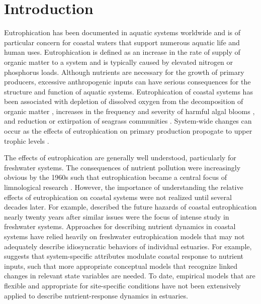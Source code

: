 \documentclass[letterpaper,12pt,oneside]{article}\usepackage{graphicx, color}
\begin{document}
\section{Introduction} \label{intro}

Eutrophication has been documented in aquatic systems worldwide and is of particular concern for coastal waters that support numerous aquatic life and human uses.  Eutrophication is defined as an increase in the rate of supply of organic matter to a system \citep{Nixon95} and is typically caused by elevated nitrogen or phosphorus loads.  Although nutrients are necessary for the growth of primary producers, excessive anthropogenic inputs can have serious consequences for the structure and function of aquatic systems.  Eutrophication of coastal systems has been associated with depletion of dissolved oxygen from the decomposition of organic matter \citep{Diaz08}, increases in the frequency and severity of harmful algal blooms \citep{Glibert13}, and reduction or extirpation of seagrass communities \citep{Duarte95,Tomasko05}.  System-wide changes can occur as the effects of eutrophication on primary production propogate to upper trophic levels \citep{Powers05}. 

The effects of eutrophication are generally well understood, particularly for freshwater systems. The consequences of nutrient pollution were increasingly obvious by the 1960s such that eutrophication became a central focus of limnological research \citep{Cloern01}.  However, the importance of understanding the relative effects of eutrophication on coastal systems were not realized until several decades later.  For example, \citet{Rosenberg85} described the future hazards of coastal eutrophication nearly twenty years after similar issues were the focus of intense study in freshwater systems.  Approaches for describing nutrient dynamics in coastal systems have relied heavily on freshwater eutrophication models that may not adequately describe idiosyncratic behaviors of individual estuaries.  For example, \citet{Cloern01} suggests that system-specific attributes modulate coastal response to nutrient inputs, such that more appropriate conceptual models that recognize linked changes in relevant state variables are needed.  To date, empirical models that are flexible and appropriate for site-specific conditions have not been extensively applied to describe nutrient-response dynamics in estuaries.
\end{document}
